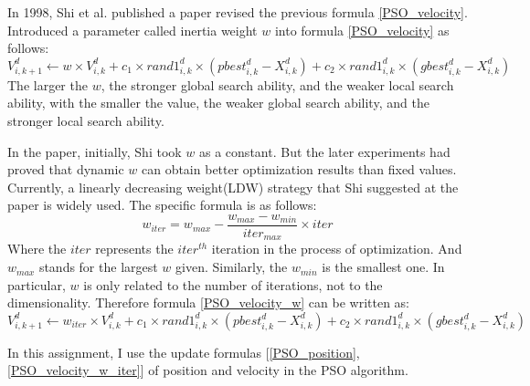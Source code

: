 \documentclass[letterpaper,12pt]{article}
\begin{document}
\par In 1998, Shi et al. published a paper \cite{shi} revised the previous formula \ref{PSO_velocity}. Introduced a parameter called inertia weight $w$ into formula \ref{PSO_velocity} as follows:
\begin{equation}
V_{i,k+1}^d \leftarrow w \times V_{i, k}^d + c_1\times rand1_{i, k}^d \times (pbest_{i, k}^d - X_{i, k}^d) + c_2\times rand1_{i, k}^d \times (gbest_{i, k}^d - X_{i, k}^d)
\label{PSO_velocity_w}
\end{equation}
The larger the $w$, the stronger global search ability, and the weaker  local search ability, with the smaller the value, the weaker global search ability, and the stronger  local search ability.

In the paper\cite{shi}, initially, Shi took $w$ as a constant. But the later experiments had proved that dynamic $w$ can obtain better optimization results than fixed values. Currently, a linearly decreasing weight(LDW) strategy that Shi suggested at the paper is widely used. The specific formula is as follows:
\begin{equation}
w_{iter} = w_{max} - \dfrac{w_{max} - w_{min}}{iter_{max}}\times iter 
\label{PSO_velocity_w_w}
\end{equation}
Where the $iter$ represents the ${iter}^{th}$ iteration in the process of optimization. And $w_{max}$ stands for the largest $w$ given. Similarly, the $w_{min}$ is the smallest one. In particular, $w$ is only related to the number of iterations, not to the dimensionality. Therefore formula \ref{PSO_velocity_w} can be written as:
\begin{equation}
V_{i,k+1}^d \leftarrow w_{iter} \times V_{i, k}^d + c_1\times rand1_{i, k}^d \times (pbest_{i, k}^d - X_{i, k}^d) + c_2\times rand1_{i, k}^d \times (gbest_{i, k}^d - X_{i, k}^d)
\label{PSO_velocity_w_iter}
\end{equation}

\par In this assignment, I use the update formulas [\ref{PSO_position}, \ref{PSO_velocity_w_iter}] of position and velocity in the PSO algorithm.
\end{document}
